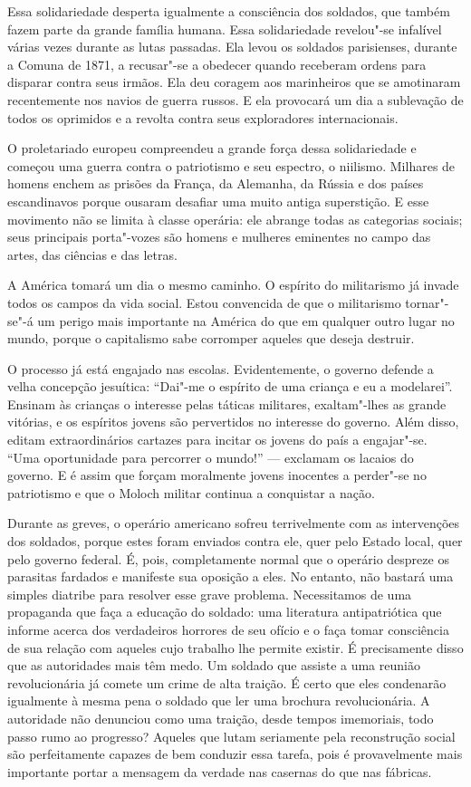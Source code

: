 Essa solidariedade desperta igualmente a consciência dos soldados, que
também fazem parte da grande família humana. Essa solidariedade
revelou"-se infalível várias vezes durante as lutas passadas. Ela 
levou os soldados parisienses, durante a Comuna de 1871, a recusar"-se
a obedecer quando receberam ordens para disparar contra seus irmãos.
Ela deu coragem aos marinheiros que se amotinaram recentemente nos
navios de guerra russos. E ela provocará um dia a sublevação de todos
os oprimidos e a revolta contra seus exploradores internacionais.

O proletariado europeu compreendeu a grande força dessa solidariedade e
começou uma guerra contra o patriotismo e seu espectro, o niilismo.
Milhares de homens enchem as prisões da França, da Alemanha, da Rússia
e dos países escandinavos porque ousaram desafiar uma muito antiga
superstição. E esse movimento não se limita à classe operária: ele
abrange todas as categorias sociais; seus principais porta"-vozes
são homens e mulheres eminentes no campo das artes, das ciências e das
letras.

A América tomará um dia o mesmo caminho. O espírito do militarismo já
invade todos os campos da vida social. Estou convencida de que o
militarismo tornar"-se"-á um perigo mais importante na América do que
em qualquer outro lugar no mundo, porque o capitalismo sabe corromper
aqueles que deseja destruir.\label{dequeomilitarismo}

O processo já está engajado nas escolas. Evidentemente, o governo
defende a velha concepção jesuítica: “Dai"-me o espírito de uma
criança e eu a modelarei”. Ensinam às crianças o interesse pelas
táticas militares, exaltam"-lhes as grande vitórias, e os espíritos
jovens são pervertidos no interesse do governo. Além disso, editam
extraordinários cartazes para incitar os jovens do país a engajar"-se.
“Uma oportunidade para percorrer o mundo!” --- exclamam os lacaios do
governo. E é assim que forçam moralmente jovens inocentes a perder"-se
no patriotismo e que o Moloch militar continua a conquistar a nação.

Durante as greves, o operário americano sofreu terrivelmente com as
intervenções dos soldados, porque estes foram enviados contra ele,
quer pelo Estado local, quer pelo governo federal. É, pois, completamente
normal que o operário despreze os parasitas fardados e manifeste sua
oposição a eles. No entanto, não bastará uma simples diatribe para
resolver esse grave problema. Necessitamos de uma propaganda que faça a
educação do soldado: uma literatura antipatriótica que informe acerca
dos verdadeiros horrores de seu ofício e o faça tomar consciência de
sua relação com aqueles cujo trabalho lhe permite existir. É
precisamente disso que as autoridades mais têm medo. Um soldado que
assiste a uma reunião revolucionária já comete um crime de alta
traição. É certo que eles condenarão igualmente à mesma pena o soldado
que ler uma brochura revolucionária. A autoridade não denunciou como
uma traição, desde tempos imemoriais, todo passo rumo ao progresso?
Aqueles que lutam seriamente pela reconstrução social são perfeitamente
capazes de bem conduzir essa tarefa, pois é provavelmente mais
importante portar a mensagem da verdade nas casernas do que nas
fábricas.

